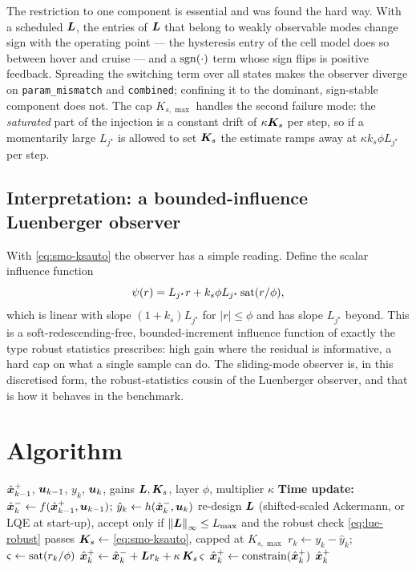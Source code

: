 The restriction to one component is essential and was found the hard way.  With a scheduled
$\bm{L}$, the entries of $\bm{L}$ that belong to weakly observable modes change sign with the
operating point --- the hysteresis entry of the cell model does so between hover and cruise --- and
a $\operatorname{sgn}(\cdot)$ term whose sign flips is positive feedback.  Spreading the switching term over
all states makes the observer diverge on \texttt{param\_mismatch} and \texttt{combined}; confining
it to the dominant, sign-stable component does not.  The cap $K_{s,\max}$ handles the second
failure mode: the \emph{saturated} part of the injection is a constant drift of
$\kappa\bm{K}_s$ per step, so if a momentarily large $L_{j^\star}$ is allowed to set $\bm{K}_s$ the
estimate ramps away at $\kappa k_s\phi L_{j^\star}$ per step.

\subsection{Interpretation: a bounded-influence Luenberger observer}
With \eqref{eq:smo-ksauto} the observer has a simple reading.  Define the scalar influence
function
\begin{equation}
\psi(r) = L_{j^\star}r + k_s\phi L_{j^\star}\operatorname{sat}(r/\phi) ,
\label{eq:smo-psi}
\end{equation}
which is linear with slope $(1+k_s)L_{j^\star}$ for $|r|\le\phi$ and has slope $L_{j^\star}$
beyond.  This is a soft-redescending-free, bounded-increment influence function of exactly the
type robust statistics prescribes: high gain where the residual is informative, a hard cap on
what a single sample can do.  The sliding-mode observer is, in this discretised form, the
robust-statistics cousin of the Luenberger observer, and that is how it behaves in the benchmark.

\section{Algorithm}
\begin{algorithm}[H]
\caption{SMO --- one sampling period}
\begin{algorithmic}[1]
\Require $\hat{\bm{x}}^{+}_{k-1}$, $\bm{u}_{k-1}$, $y_k$, $\bm{u}_k$, gains $\bm{L},\bm{K}_s$, layer $\phi$, multiplier $\kappa$
\State \textbf{Time update:} $\hat{\bm{x}}^{-}_k \gets f(\hat{\bm{x}}^{+}_{k-1},\bm{u}_{k-1})$; \quad $\hat{y}_k \gets h(\hat{\bm{x}}^{-}_k,\bm{u}_k)$
  \State re-design $\bm{L}$ (shifted-scaled Ackermann, or LQE at start-up), accept only if $\left\lVert \bm{L} \right\rVert_\infty\le L_{\max}$ and the robust check \eqref{eq:lue-robust} passes
  \State $\bm{K}_s \gets$ \eqref{eq:smo-ksauto}, capped at $K_{s,\max}$
\EndIf
\State $r_k \gets y_k - \hat{y}_k$; \quad $\varsigma \gets \operatorname{sat}(r_k/\phi)$
\State $\hat{\bm{x}}^{+}_k \gets \hat{\bm{x}}^{-}_k + \bm{L} r_k + \kappa\,\bm{K}_s\,\varsigma$
\State $\hat{\bm{x}}^{+}_k \gets \operatorname{constrain}(\hat{\bm{x}}^{+}_k)$
\Ensure $\hat{\bm{x}}^{+}_k$
\end{algorithmic}
\end{algorithm}

